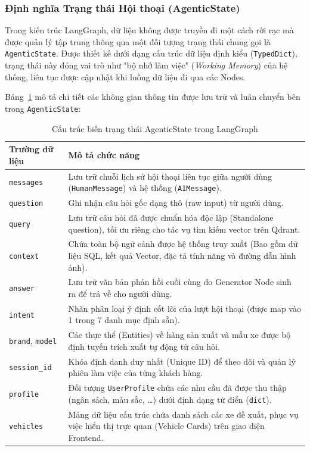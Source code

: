 \subsubsection{Định nghĩa Trạng thái Hội thoại (AgenticState)}

Trong kiến trúc LangGraph, dữ liệu không được truyền đi một cách rời rạc mà được quản lý tập trung thông qua một đối tượng trạng thái chung gọi là \texttt{AgenticState}. Được thiết kế dưới dạng cấu trúc dữ liệu định kiểu (\texttt{TypedDict}), trạng thái này đóng vai trò như "bộ nhớ làm việc" (\textit{Working Memory}) của hệ thống, liên tục được cập nhật khi luồng dữ liệu đi qua các Nodes. 

Bảng~\ref{tab:agentic-state} mô tả chi tiết các không gian thông tin được lưu trữ và luân chuyển bên trong \texttt{AgenticState}:

\begin{table}[H]
\centering
\caption{Cấu trúc biến trạng thái AgenticState trong LangGraph}
\label{tab:agentic-state}
\renewcommand{\arraystretch}{1.3} %
\begin{tabular}{|p{}|p{}|}
\hline
\textbf{Trường dữ liệu} & \textbf{Mô tả chức năng} \\ \hline
\texttt{messages} & Lưu trữ chuỗi lịch sử hội thoại liên tục giữa người dùng (\texttt{HumanMessage}) và hệ thống (\texttt{AIMessage}). \\ \hline
\texttt{question} & Ghi nhận câu hỏi gốc dạng thô (raw input) từ người dùng. \\ \hline
\texttt{query} & Lưu trữ câu hỏi đã được chuẩn hóa độc lập (Standalone question), tối ưu riêng cho tác vụ tìm kiếm vector trên Qdrant. \\ \hline
\texttt{context} & Chứa toàn bộ ngữ cảnh được hệ thống truy xuất (Bao gồm dữ liệu SQL, kết quả Vector, đặc tả tính năng và đường dẫn hình ảnh). \\ \hline
\texttt{answer} & Lưu trữ văn bản phản hồi cuối cùng do Generator Node sinh ra để trả về cho người dùng. \\ \hline
\texttt{intent} & Nhãn phân loại ý định cốt lõi của lượt hội thoại (được map vào 1 trong 7 danh mục định sẵn). \\ \hline
\texttt{brand}, \texttt{model} & Các thực thể (Entities) về hãng sản xuất và mẫu xe được bộ định tuyến trích xuất tự động từ câu hỏi. \\ \hline
\texttt{session\_id} & Khóa định danh duy nhất (Unique ID) để theo dõi và quản lý phiên làm việc của từng khách hàng. \\ \hline
\texttt{profile} & Đối tượng \texttt{UserProfile} chứa các nhu cầu đã được thu thập (ngân sách, màu sắc, \ldots) dưới định dạng từ điển (\texttt{dict}). \\ \hline
\texttt{vehicles} & Mảng dữ liệu cấu trúc chứa danh sách các xe đề xuất, phục vụ việc hiển thị trực quan (Vehicle Cards) trên giao diện Frontend. \\ \hline
\end{tabular}
\end{table}
